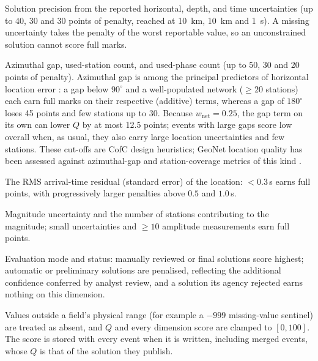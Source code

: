 \documentclass[12pt]{article}
\begin{document}
\begin{description}[leftmargin=2em]
  \item[$Q_{\text{loc}}$: Location (35\%)]  Solution precision from the
    reported horizontal, depth, and time uncertainties (up to 40, 30 and 30
    points of penalty, reached at 10~km, 10~km and 1~s).  A missing uncertainty
    takes the penalty of the worst reportable value, so an unconstrained
    solution cannot score full marks.
  \item[$Q_{\text{net}}$: Network geometry (25\%)]  Azimuthal gap,
    used-station count, and used-phase count (up to 50, 30 and 20 points of
    penalty).  Azimuthal gap is among the principal predictors of horizontal
    location error \citep{bondar2004,warrensmith2025}: a gap below $90^{\circ}$
    and a well-populated network ($\geq 20$ stations) each earn full marks on
    their respective (additive) terms, whereas a gap of $180^{\circ}$ loses 45
    points and few stations up to 30.  Because $w_{\text{net}} = 0.25$, the gap
    term on its own can lower $Q$ by at most 12.5 points; events with large gaps
    score low overall when, as usual, they also carry large location
    uncertainties and few stations.  These cut-offs are CofC design heuristics;
    GeoNet location quality has been assessed against azimuthal-gap and
    station-coverage metrics of this kind \citep{warrensmith2025}.
  \item[$Q_{\text{sol}}$: Solution fit (15\%)]  The RMS arrival-time residual
    (standard error) of the location: $< 0.3$\,s earns full points, with
    progressively larger penalties above $0.5$ and $1.0$\,s.
  \item[$Q_{\text{mag}}$: Magnitude (15\%)]  Magnitude uncertainty and the
    number of stations contributing to the magnitude; small uncertainties and
    $\geq 10$ amplitude measurements earn full points.
  \item[$Q_{\text{eval}}$: Evaluation (10\%)]  Evaluation mode and status:
    manually reviewed or final solutions score highest; automatic or
    preliminary solutions are penalised, reflecting the additional confidence
    conferred by analyst review, and a solution its agency rejected earns
    nothing on this dimension.
\end{description}
Values outside a field's physical range (for example a $-999$ missing-value
sentinel) are treated as absent, and $Q$ and every dimension score are clamped
to $[0,100]$.  The score is stored with every event when it is written, including
merged events, whose $Q$ is that of the solution they publish.
\end{document}
